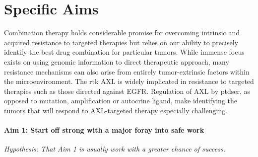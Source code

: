 

\newcommand{\SpecificAimOne}{Start off strong with a major foray into safe work}
\newcommand{\SpecificAimOneA}{A task that comes with convincing preliminary data}
\newcommand{\SpecificAimOneB}{Another task that is essential to the later efforts}
\newcommand{\SpecificAimOneC}{One more task that needs to be accomplished early on in the project}
\newcommand{\SpecificAimOneD}{Validate model predictions of the relationship between signaling network state and resistance}

\newcommand{\SpecificAimTwo}{That middle area where you will probably end up spending most of your time}
\newcommand{\SpecificAimTwoA}{One of those tasks that just could not be skipped}
\newcommand{\SpecificAimTwoB}{A task I am really looking forward to}
\newcommand{\SpecificAimTwoC}{Something pulling this whole aim together}

\newcommand{\SpecificAimThree}{A third major area that is quite risky}
\newcommand{\SpecificAimThreeA}{Since we are just warming up this task is more likely to be feasible}
\newcommand{\SpecificAimThreeB}{Getting this to happen will really be quite pricey}
\newcommand{\SpecificAimThreeC}{This task really pulls everything together but will require everything working perfectly}


\section{Specific Aims}

Combination therapy holds considerable promise for overcoming intrinsic and acquired resistance to targeted therapies but relies on our ability to precisely identify the best drug combination for particular tumors. While immense focus exists on using genomic information to direct therapeutic approach, many resistance mechanisms can also arise from entirely tumor-extrinsic factors within the microenvironment. The \gls{rtk} AXL is widely implicated in resistance to targeted therapies such as those directed against EGFR. Regulation of AXL by \gls{ptdser}, as opposed to mutation, amplification or autocrine ligand, make identifying the tumors that will respond to AXL-targeted therapy especially challenging\cite{Meyer:CellSys}.

\paragraph*{Aim 1: \SpecificAimOne} \emph{Hypothesis: That Aim 1 is usually work with a greater chance of success.}

